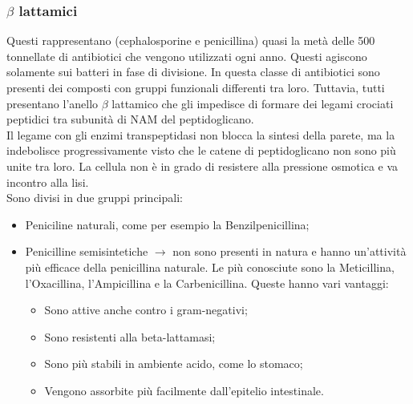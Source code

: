 \subsubsection{$\beta$ lattamici}
Questi rappresentano (cephalosporine e penicillina) quasi la metà delle 500 tonnellate di antibiotici che vengono utilizzati ogni anno. Questi agiscono solamente sui batteri in fase di divisione. In questa classe di antibiotici sono presenti dei composti con gruppi funzionali differenti tra loro. Tuttavia, tutti presentano l'anello $\beta$ lattamico che gli impedisce di formare dei legami crociati peptidici tra subunità di NAM del peptidoglicano. 
\\Il legame con gli enzimi transpeptidasi non blocca la sintesi della parete, ma la indebolisce progressivamente visto che le catene di peptidoglicano non sono più unite tra loro. La cellula non è in grado di resistere alla pressione osmotica e va incontro alla lisi.
\\Sono divisi in due gruppi principali:
\begin{itemize}
    \item Peniciline naturali, come per esempio la Benzilpenicillina;
    \item Penicilline semisintetiche $\xrightarrow{}$ non sono presenti in natura e hanno un'attività più efficace della penicillina naturale. Le più conosciute sono la Meticillina, l'Oxacillina, l'Ampicillina e la Carbenicillina. Queste hanno vari vantaggi:
    \begin{itemize}
        \item Sono attive anche contro i gram-negativi; 
        \item Sono resistenti alla beta-lattamasi; 
        \item Sono più stabili in ambiente acido, come lo stomaco; 
        \item Vengono assorbite più facilmente dall'epitelio intestinale.
    \end{itemize}
\end{itemize}
